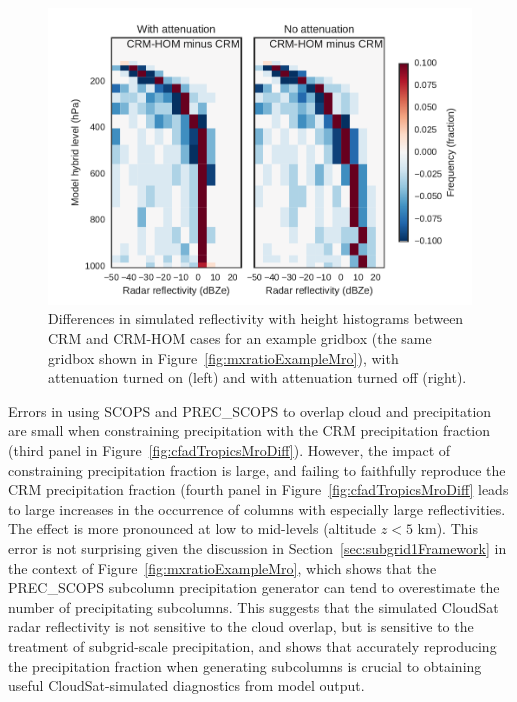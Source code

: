 \begin{figure}[htbp]
\centering
\includegraphics{graphics/subgrid1_cfadDbze94_att-test.pdf}
\caption{\label{fig:cfadTestatt}Differences in simulated reflectivity
with height histograms between CRM and CRM-HOM cases for an example
gridbox (the same gridbox shown in Figure~\ref{fig:mxratioExampleMro}),
with attenuation turned on (left) and with attenuation turned off
(right).}\label{fig:cfadTestatt}
\end{figure}

Errors in using SCOPS and PREC\_SCOPS to overlap cloud and precipitation
are small when constraining precipitation with the CRM precipitation
fraction (third panel in Figure~\ref{fig:cfadTropicsMroDiff}). However,
the impact of constraining precipitation fraction is large, and failing
to faithfully reproduce the CRM precipitation fraction (fourth panel in
Figure~\ref{fig:cfadTropicsMroDiff} leads to large increases in the
occurrence of columns with especially large reflectivities. The effect
is more pronounced at low to mid-levels (altitude \(z < 5\) km). This
error is not surprising given the discussion in
Section~\ref{sec:subgrid1Framework} in the context of
Figure~\ref{fig:mxratioExampleMro}, which shows that the PREC\_SCOPS
subcolumn precipitation generator can tend to overestimate the number of
precipitating subcolumns. This suggests that the simulated CloudSat
radar reflectivity is not sensitive to the cloud overlap, but is
sensitive to the treatment of subgrid-scale precipitation, and shows
that accurately reproducing the precipitation fraction when generating
subcolumns is crucial to obtaining useful CloudSat-simulated diagnostics
from model output.

